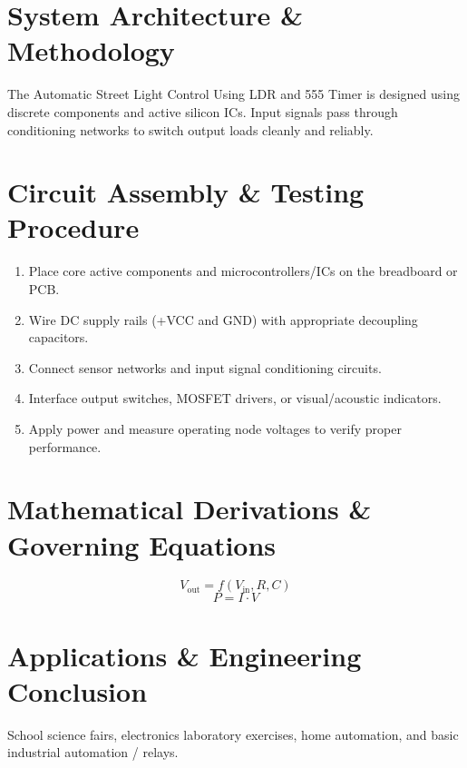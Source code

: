 \documentclass[11pt,a4paper]{article}
\begin{document}
\section{System Architecture \& Methodology}
The Automatic Street Light Control Using LDR and 555 Timer is designed using discrete components and active silicon ICs. Input signals pass through conditioning networks to switch output loads cleanly and reliably.

\section{Circuit Assembly \& Testing Procedure}
\begin{enumerate}
    \item Place core active components and microcontrollers/ICs on the breadboard or PCB.
    \item Wire DC supply rails (+VCC and GND) with appropriate decoupling capacitors.
    \item Connect sensor networks and input signal conditioning circuits.
    \item Interface output switches, MOSFET drivers, or visual/acoustic indicators.
    \item Apply power and measure operating node voltages to verify proper performance.
\end{enumerate}

\section{Mathematical Derivations \& Governing Equations}
\begin{equation}
V_{\text{out}} = f(V_{\text{in}}, R, C)
\end{equation}
\begin{equation}
P = I \cdot V
\end{equation}

\section{Applications \& Engineering Conclusion}
School science fairs, electronics laboratory exercises, home automation, and basic industrial automation / relays.
\end{document}
